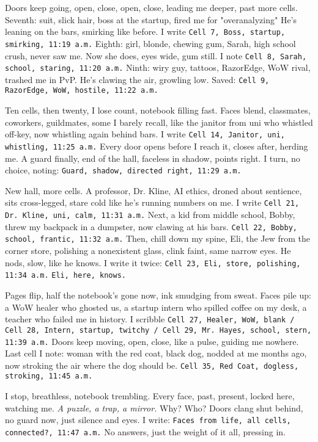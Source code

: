 \documentclass[12pt,oneside]{book} %
\newcommand{\note}[1]{\texttt{#1}}
\begin{document}
Doors keep going, open, close, open, close, leading me deeper, past more cells. Seventh: suit, slick hair, boss at the startup, fired me for "overanalyzing" He’s leaning on the bars, smirking like before. I write \note{Cell 7, Boss, startup, smirking, 11:19 a.m.} Eighth: girl, blonde, chewing gum, Sarah, high school crush, never saw me. Now she does, eyes wide, gum still. I note \note{Cell 8, Sarah, school, staring, 11:20 a.m.} Ninth: wiry guy, tattoos, RazorEdge, WoW rival, trashed me in PvP. He’s clawing the air, growling low. Saved: \note{Cell 9, RazorEdge, WoW, hostile, 11:22 a.m.}

Ten cells, then twenty, I lose count, notebook filling fast. Faces blend, classmates, coworkers, guildmates, some I barely recall, like the janitor from uni who whistled off-key, now whistling again behind bars. I write \note{Cell 14, Janitor, uni, whistling, 11:25 a.m.} Every door opens before I reach it, closes after, herding me. A guard finally, end of the hall, faceless in shadow, points right. I turn, no choice, noting: \note{Guard, shadow, directed right, 11:29 a.m.}

New hall, more cells. A professor, Dr. Kline, AI ethics, droned about sentience, sits cross-legged, stare cold like he’s running numbers on me. I write \note{Cell 21, Dr. Kline, uni, calm, 11:31 a.m.} Next, a kid from middle school, Bobby, threw my backpack in a dumpster, now clawing at his bars. \note{Cell 22, Bobby, school, frantic, 11:32 a.m.} Then, chill down my spine, Eli, the Jew from the corner store, polishing a nonexistent glass, clink faint, same narrow eyes. He nods, slow, like he knows. I write it twice: \note{Cell 23, Eli, store, polishing, 11:34 a.m.} \note{Eli, here, knows.}

Pages flip, half the notebook’s gone now, ink smudging from sweat. Faces pile up: a WoW healer who ghosted us, a startup intern who spilled coffee on my desk, a teacher who failed me in history. I scribble \note{Cell 27, Healer, WoW, blank / Cell 28, Intern, startup, twitchy / Cell 29, Mr. Hayes, school, stern, 11:39 a.m.} Doors keep moving, open, close, like a pulse, guiding me nowhere. Last cell I note: woman with the red coat, black dog, nodded at me months ago, now stroking the air where the dog should be. \note{Cell 35, Red Coat, dogless, stroking, 11:45 a.m.}

I stop, breathless, notebook trembling. Every face, past, present, locked here, watching me. \textit{A puzzle, a trap, a mirror.} Why? Who? Doors clang shut behind, no guard now, just silence and eyes. I write: \note{Faces from life, all cells, connected?, 11:47 a.m.} No answers, just the weight of it all, pressing in.
\end{document}
